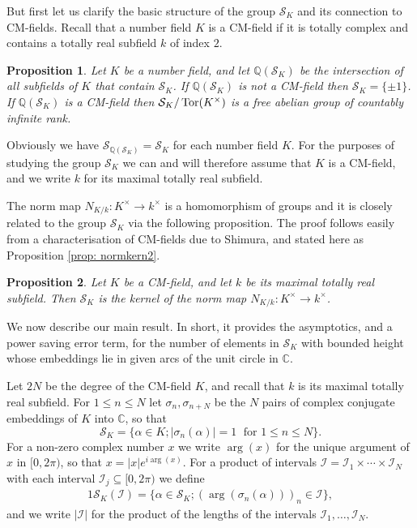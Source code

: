 \documentclass[11pt]{amsart}
\newtheorem{proposition}{Proposition}[section]
\numberwithin{equation}{eqncounter}
\def\IC{\mathbb C}
\def\IQ{\mathbb Q}
\def\I{\mathcal{I}}
\newcommand{\Norm}{N_{K/k}}
\def\Tor{\mathop{\rm Tor}\nolimits}
\def\Sc{\mathcal{S}}
\begin{document}
But first let us clarify the basic structure of 
the group $\Sc_K$ and its connection to CM-fields. 
Recall that a number field $K$ is a CM-field if it is totally complex and contains a totally real
subfield $k$ of index $2$.
\begin{proposition}\label{prop:SKbasic}
Let $K$ be a number field, and let
$\IQ(\Sc_K)$ be the intersection of all subfields of $K$ that
contain $\Sc_K$.
 If $\IQ(\Sc_K)$ is not a CM-field then $\Sc_K = \{\pm 1\}$.
If $\IQ(\Sc_K)$ is  a CM-field then $\Sc_K/\Tor(K^\times)$ is a free abelian group of countably infinite rank.
\end{proposition}
Obviously we have $\Sc_{\IQ(\Sc_K)}=\Sc_K$ for each number field $K$.
For the purposes of studying the group $\Sc_K$ we can and will therefore assume that $K$ is a CM-field, and we write $k$ for its maximal totally real subfield. 

The norm map $\Norm:K^\times\to k^\times$ is a homomorphism of groups
and it is closely related to the group $\Sc_K$ via the following proposition.
The proof follows easily from a characterisation of CM-fields due to Shimura,
and stated here as Proposition \ref{prop: normkern2}.

\begin{proposition}\label{prop:SKnormkern}
Let $K$ be a CM-field, and let $k$ be its maximal totally real subfield. Then $\Sc_K$
is the kernel of the norm map $\Norm:K^\times\to k^\times$.
\end{proposition}

We now describe our main result. In short, it provides the asymptotics, and a power saving error term, for the number of elements in $\Sc_K$ with bounded height whose embeddings lie in given arcs
of the unit circle in $\IC$. 

Let $2N$ be the degree of the CM-field  $K$, and recall that $k$ is its maximal totally real subfield. 
For $1\leq n\leq N$ let $\sigma_n,\sigma_{n+N}$ be the $N$ pairs of complex conjugate embeddings of $K$ into $\IC$, so that 
$$\Sc_K=\{\alpha\in K; |\sigma_n(\alpha)|=1 \; \text{ for } 1\leq n\leq N\}.$$ 
 For a non-zero complex number $x$ we write $\arg(x)$ for the unique argument of $x$ in $[0,2\pi)$, so that $x=|x|e^{i\arg(x)}$.
For a product of intervals $\I=\I_1\times \cdots \times \I_N$ with each interval $\I_j\subseteq [0,2\pi)$ we define
\begin{alignat*}1
\Sc_K(\I)=\{\alpha\in \Sc_K; (\arg(\sigma_n(\alpha)))_n\in \I\},
\end{alignat*}
and we write $|\I|$ for the product of the lengths of the intervals $\I_1,\ldots, \I_N$.
\end{document}
